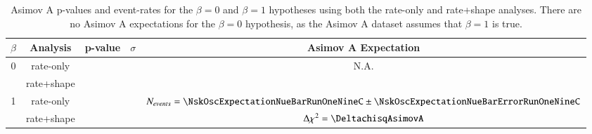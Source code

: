 \begin{table}
	\centering
	\begin{tabular}{|c|c|c|c|c|}
		\hline
		$\beta$				& Analysis		& p-value                		& $\sigma$ 						   & Asimov A Expectation\\
		\hline
		\multirow{ 2}{*}{0} & rate-only		& \pvalRateOnlyBetaZeroAsimovA  & \sigmaRateOnlyBetaZeroAsimovA    & \multirow{ 2}{*}{N.A.}    \\
		\cline{2-4}
			   				& rate+shape	& \pvalRateShapeBetaZeroAsimovA & \sigmaRateShapeBetaZeroAsimovA   &    \\
		\hline
		\multirow{ 2}{*}{1} & rate-only		& \pvalRateOnlyBetaOneAsimovA   & \sigmaRateOnlyBetaOneAsimovA     & $N_{events} = \NskOscExpectationNueBarRunOneNineC \pm \NskOscExpectationNueBarErrorRunOneNineC$ \\
		\cline{2-5}
			   				& rate+shape	& \pvalRateShapeBetaOneAsimovA  & \sigmaRateShapeBetaOneAsimovA    & $\Delta \chi^2 = \DeltachisqAsimovA$ \\
		\hline
	\end{tabular}
	\caption{Asimov A p-values and event-rates for the $\beta = 0$ and $\beta = 1$ hypotheses using both the rate-only and rate+shape analyses. There are no Asimov A expectations for the $\beta = 0$ hypothesis, as the Asimov A dataset assumes that $\beta = 1$ is true.}
	\label{tab:sensitivity_AsimovA}
\end{table}
